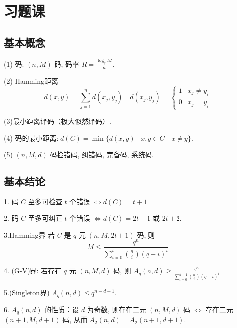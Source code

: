\section{习题课}
\subsection{基本概念}

(1) 码: $ (n, M) $ 码, 码率 $ R=\frac{\log _{q} M}{n} $.

(2) Hamming距离
$$
d(x, y)=\sum_{j=1}^{n} d\left(x_{j}, y_{j}\right) \quad d\left(x_{j}, y_{j}\right)=\left\{\begin{array}{ll}
1 & x_{j} \neq y_{j} \\
0 & x_{j}=y_{j}
\end{array}\right.
$$

(3)最小距离译码（极大似然译码）.

(4) 码的最小距离: $ d(C)=\min \{d(x, y) \mid x, y \in C \quad x \neq y\} $.

(5) $ (n, M, d) $ 码检错码, 纠错码, 完备码, 系统码.

\subsection{基本结论}
1. 码 $ C $ 至多可检查 $ t $ 个错误 $ \Leftrightarrow d(C)=t+1 $.

2. 码 $ C $ 至多可纠正 $ t $ 个错误 $ \Leftrightarrow d(C)=2 t+1 $ 或 $ 2 t+2 $.

3.Hamming界 若 $ C $ 是 $ q $ 元 $ (n, M, 2 t+1) $ 码, 则
$$
M \leq \frac{q^{n}}{\sum\limits_{i=0}^{t}\binom{n}{i}(q-i)^{i}}
$$

4. (G-V)界: 若存在 $ q $ 元 $ (n, M, d) $ 码, 则 $ A_{q}(n, d) \geq \frac{q^{n}}{\sum\limits_{i=0}^{d-1}\binom{n}{i}(q-i)^{i}} $

5.(Singleton界) $ A_{q}(n, d) \leq q^{n-d+1} $.

6. $ A_{q}(n, d) $ 的性质：设 $ d $ 为奇数, 则存在二元 $ (n, M, d) $ 码 $ \Leftrightarrow $ 存在二元 $ (n+1, M, d+1) $ 码, 从而 $ A_{2}(n, d)=A_{2}(n+1, d+1) $.

